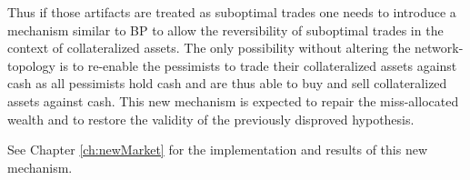\documentclass[Bachelorarbeit.tex]{subfiles}
\begin{document}
\medskip 

Thus if those artifacts are treated as suboptimal trades one needs to introduce a mechanism similar to BP to allow the reversibility of suboptimal trades in the context of collateralized assets. The only possibility without altering the network-topology is to re-enable the pessimists to trade their collateralized assets against cash as all pessimists hold cash and are thus able to buy and sell collateralized assets against cash. This new mechanism is expected to repair the miss-allocated wealth and to restore the validity of the previously disproved hypothesis.

\medskip 

See Chapter \ref{ch:newMarket} for the implementation and results of this new mechanism.
\end{document}
